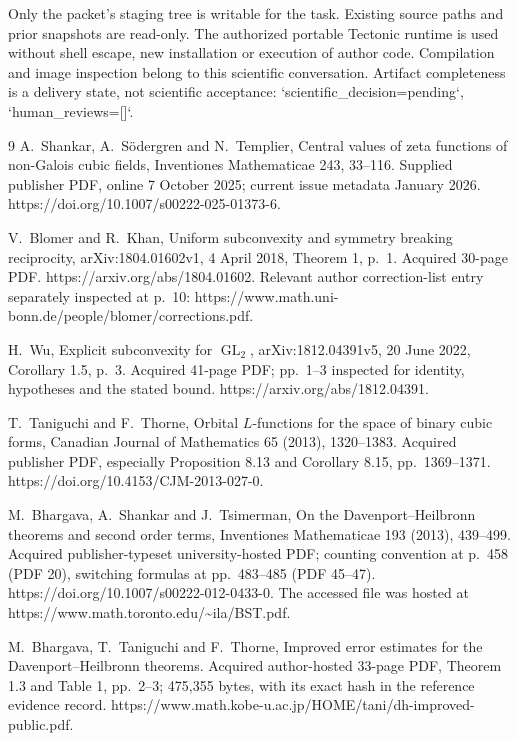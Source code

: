 \documentclass[10pt]{article}
\begin{document}
Only the packet’s staging tree is writable for the task. Existing source paths and prior snapshots are read-only. The authorized portable Tectonic runtime is used without shell escape, new installation or execution of author code. Compilation and image inspection belong to this scientific conversation. Artifact completeness is a delivery state, not scientific acceptance: `scientific\_decision=pending`, `human\_reviews=[]`.\par
9 A. Shankar, A. Södergren and N. Templier, Central values of zeta functions of non-Galois cubic fields, Inventiones Mathematicae 243, 33–116. Supplied publisher PDF, online 7 October 2025; current issue metadata January 2026. https://doi.org/10.1007/s00222-025-01373-6.\par
V. Blomer and R. Khan, Uniform subconvexity and symmetry breaking reciprocity, arXiv:1804.01602v1, 4 April 2018, Theorem 1, p. 1. Acquired 30-page PDF. https://arxiv.org/abs/1804.01602. Relevant author correction-list entry separately inspected at p. 10: https://www.math.uni-bonn.de/people/blomer/corrections.pdf.\par
H. Wu, Explicit subconvexity for \(\operatorname{GL}_2\), arXiv:1812.04391v5, 20 June 2022, Corollary 1.5, p. 3. Acquired 41-page PDF; pp. 1–3 inspected for identity, hypotheses and the stated bound. https://arxiv.org/abs/1812.04391.\par
T. Taniguchi and F. Thorne, Orbital \(L\)-functions for the space of binary cubic forms, Canadian Journal of Mathematics 65 (2013), 1320–1383. Acquired publisher PDF, especially Proposition 8.13 and Corollary 8.15, pp. 1369–1371. https://doi.org/10.4153/CJM-2013-027-0.\par
M. Bhargava, A. Shankar and J. Tsimerman, On the Davenport–Heilbronn theorems and second order terms, Inventiones Mathematicae 193 (2013), 439–499. Acquired publisher-typeset university-hosted PDF; counting convention at p. 458 (PDF 20), switching formulas at pp. 483–485 (PDF 45–47). https://doi.org/10.1007/s00222-012-0433-0. The accessed file was hosted at https://www.math.toronto.edu/\textasciitilde{}ila/BST.pdf.\par
M. Bhargava, T. Taniguchi and F. Thorne, Improved error estimates for the Davenport–Heilbronn theorems. Acquired author-hosted 33-page PDF, Theorem 1.3 and Table 1, pp. 2–3; 475,355 bytes, with its exact hash in the reference evidence record. https://www.math.kobe-u.ac.jp/HOME/tani/dh-improved-public.pdf.\par
\end{document}
